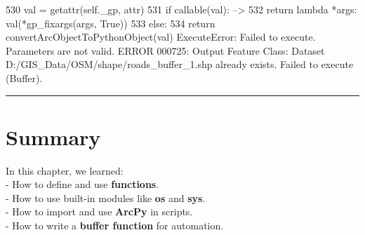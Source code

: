 \documentclass[
  11pt,
  letterpaper,
]{book}
\begin{document}
\begin{Highlighting}
\textcolor{QuartoInternalColor2}{}\textcolor{QuartoInternalColor4}{    530}\textcolor{QuartoInternalColor2}{ val }\textcolor{QuartoInternalColor6}{=}\textcolor{QuartoInternalColor2}{ }\textcolor{QuartoInternalColor10}{getattr}\textcolor{QuartoInternalColor2}{(}\textcolor{QuartoInternalColor10}{self}\textcolor{QuartoInternalColor2}{}\textcolor{QuartoInternalColor6}{.}\textcolor{QuartoInternalColor2}{\_gp, attr)}
\textcolor{QuartoInternalColor2}{}\textcolor{QuartoInternalColor4}{    531}\textcolor{QuartoInternalColor2}{ }\textcolor{QuartoInternalColor10}{if}\textcolor{QuartoInternalColor2}{ }\textcolor{QuartoInternalColor10}{callable}\textcolor{QuartoInternalColor2}{(val):}
\textcolor{QuartoInternalColor2}{}\textcolor{QuartoInternalColor3}{--> 532}\textcolor{QuartoInternalColor2}{     }\textcolor{QuartoInternalColor10}{return}\textcolor{QuartoInternalColor2}{ }\textcolor{QuartoInternalColor10}{lambda}\textcolor{QuartoInternalColor2}{ }\textcolor{QuartoInternalColor6}{*}\textcolor{QuartoInternalColor2}{args: val(}\textcolor{QuartoInternalColor6}{*}\textcolor{QuartoInternalColor2}{gp\_fixargs(args, }\textcolor{QuartoInternalColor10}{True}\textcolor{QuartoInternalColor2}{))}
\textcolor{QuartoInternalColor2}{}\textcolor{QuartoInternalColor4}{    533}\textcolor{QuartoInternalColor2}{ }\textcolor{QuartoInternalColor10}{else}\textcolor{QuartoInternalColor2}{:}
\textcolor{QuartoInternalColor2}{}\textcolor{QuartoInternalColor4}{    534}\textcolor{QuartoInternalColor2}{     }\textcolor{QuartoInternalColor10}{return}\textcolor{QuartoInternalColor2}{ convertArcObjectToPythonObject(val)}
\textcolor{QuartoInternalColor2}{}\textcolor{QuartoInternalColor1}{ExecuteError}\textcolor{QuartoInternalColor2}{: Failed to execute. Parameters are not valid.}
\textcolor{QuartoInternalColor2}{ERROR 000725: Output Feature Class: Dataset D:/GIS\_Data/OSM/shape/roads\_buffer\_1.shp already exists.}
\textcolor{QuartoInternalColor2}{Failed to execute (Buffer).}
\end{Highlighting}

\begin{center}\rule{0.5\linewidth}{0.5pt}\end{center}

\section{Summary}\label{summary-3}

In this chapter, we learned:\\
- How to define and use \textbf{functions}.\\
- How to use built-in modules like \textbf{os} and \textbf{sys}.\\
- How to import and use \textbf{ArcPy} in scripts.\\
- How to write a \textbf{buffer function} for automation.
\end{document}
